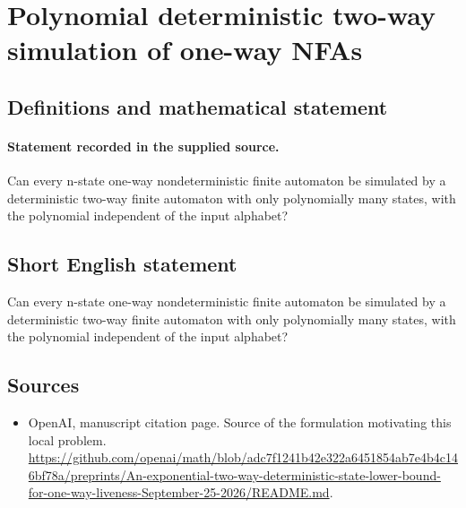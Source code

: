 \documentclass[11pt]{article}
\begin{document}
\section*{Polynomial deterministic two-way simulation of one-way NFAs}\label{statement}
\subsection{Definitions and mathematical statement}
\paragraph{Statement recorded in the supplied source.}
Can every n-state one-way nondeterministic finite automaton be simulated by a deterministic two-way finite automaton with only polynomially many states, with the polynomial independent of the input alphabet?
\subsection{Short English statement}
Can every n-state one-way nondeterministic finite automaton be simulated by a deterministic two-way finite automaton with only polynomially many states, with the polynomial independent of the input alphabet?
\subsection{Sources}
\begin{itemize}
\item[S1] OpenAI, manuscript citation page. Source of the formulation motivating this local problem.
\url{https://github.com/openai/math/blob/adc7f1241b42e322a6451854ab7e4b4c146bf78a/preprints/An-exponential-two-way-deterministic-state-lower-bound-for-one-way-liveness-September-25-2026/README.md}.
\end{itemize}
\end{document}
